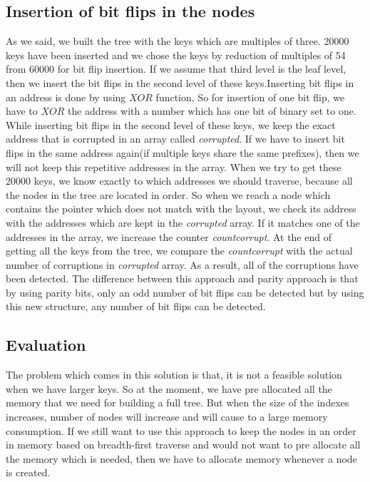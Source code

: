 \documentclass[12pt]{report}
\begin{document}
\subsection{Insertion of bit flips in the nodes}

As we said, we built the tree with the keys which are multiples of three. 20000 keys have been inserted and we chose the keys by reduction of multiples of 54 from 60000 for bit flip insertion. If we assume that third level is the leaf level, then we insert the bit flips in the second level of these keys.Inserting bit flips in an address is done by using $XOR$ function, So for insertion of one bit flip, we have to $XOR$ the address with a number which has one bit of binary set to one. While inserting bit flips in the second level of these keys, we keep the exact address that is corrupted in an array called \textit{corrupted}. If we have to insert bit flips in the same address again(if multiple keys share the same prefixes), then we will not keep this repetitive addresses in the array. When we try to get these 20000 keys, we know exactly to which addresses we should traverse, because all the nodes in the tree are located in order. So when we reach a node which contains the pointer which does not match with the layout, we check its address with the addresses which are kept in the \textit{corrupted} array. If it matches one of the addresses in the array, we increase the counter  \textit{countcorrupt}. At the end of getting all the keys from the tree, we compare the \textit{countcorrupt} with the actual number of corruptions in \textit{corrupted} array. As a result, all of the corruptions have been detected. The difference between this approach and parity approach is that by using parity bits, only an odd number of bit flips can be detected but by using this new structure, any number of bit flips can be detected.

\subsection{Evaluation}
The problem which comes in this solution is that, it is not a feasible solution when we have larger keys. So at the moment, we have pre allocated all the memory that we need for building a full tree. But when the size of the indexes increases, number of nodes will increase and will cause to a large memory consumption. If we still want to use this approach to keep the nodes in an order in memory based on breadth-first traverse and would not want to pre allocate all the memory which is needed, then we have to allocate memory whenever a node is created.
\end{document}
